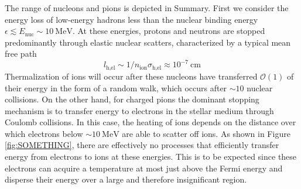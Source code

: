 \documentclass[twocolumn,showpacs,preprintnumbers,amsmath,amssymb,prd]{revtex4}
\newcommand{\OO}{\mathcal{O}}
\newcommand{\MeV}{\text{MeV}}
\begin{document}
The range of nucleons and pions is depicted in Summary. 
First we consider the energy loss of low-energy hadrons less than the nuclear binding energy $\epsilon \lesssim E_\text{nuc} \sim 10 ~\text{MeV}$. 
At these energies, protons and neutrons are stopped predominantly through elastic nuclear scatters, characterized by a typical mean free path
\begin{equation}
l_\text{h,el} \sim 1/n_\text{ion} \sigma_\text{h,el} \approx 10^{-7} ~\text{cm} 
\end{equation}
Thermalization of ions will occur after these nucleons have transferred $\OO(1)$ of their energy in the form of a random walk, which occurs after $\sim 10$ nuclear collisions. 
On the other hand, for charged pions the dominant stopping mechanism is to transfer energy to electrons in the stellar medium through Coulomb collisions.
In this case, the heating of ions depends on the distance over which electrons below $\sim 10~\MeV$ are able to scatter off ions. 
As shown in Figure \ref{fig:SOMETHING}, there are effectively no processes that efficiently transfer energy from electrons to ions at these energies. 
This is to be expected since these electrons can acquire a temperature at most just above the Fermi energy and disperse their energy over a large and therefore insignificant region. 
\end{document}
